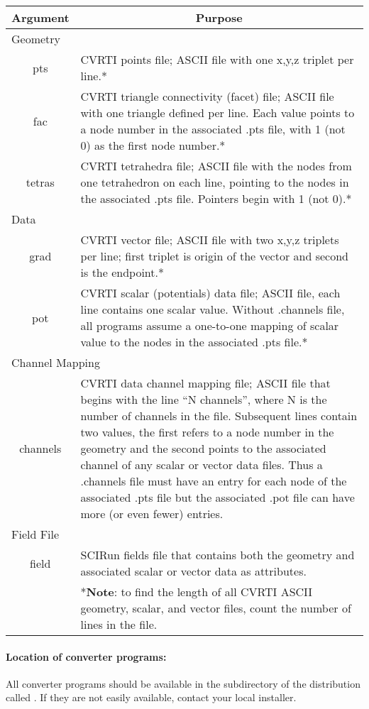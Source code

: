 \begin{center}
\begin{tabular}{|c|p{4in}|} \hline
\multicolumn{1}{|c|}{Argument} &
\multicolumn{1}{|c|}{Purpose} \\ \hline
\multicolumn{2}{|l|}{Geometry} \\ \hline
pts & CVRTI points file; ASCII file with one x,y,z triplet per line.*\\
fac & CVRTI triangle connectivity (facet) file; ASCII file with one
    triangle defined per line.  Each value points to a node number in the
    associated .pts file, with 1 (not 0) as the first node number.*  \\
tetras & CVRTI tetrahedra file; ASCII file with the nodes from one
    tetrahedron on each line, pointing to the nodes in the associated .pts
    file.  Pointers begin with 1 (not 0).*\\ \hline
\multicolumn{2}{|l|}{Data} \\ \hline
grad & CVRTI vector file; ASCII file with two x,y,z triplets per line;
    first triplet is origin of the vector and second is the endpoint.*\\
pot & CVRTI scalar (potentials) data file; ASCII file,  each line contains
    one scalar value.  Without .channels file, all programs assume a
    one-to-one mapping of scalar value to the  nodes in the associated .pts
    file.*\\ \hline
\multicolumn{2}{|l|}{Channel Mapping} \\ \hline
channels & CVRTI data channel mapping file; ASCII file that begins with the
    line ``N channels'', where N is the number of channels in the file.
    Subsequent lines contain two values, the first refers to a node number in
    the geometry and the second points to the associated channel of any scalar
    or vector data files.  Thus a .channels file must have an entry for each
    node of the associated .pts file but the associated .pot file can have more
    (or even fewer) entries.\\ \hline
\multicolumn{2}{|l|}{Field File} \\ \hline
field & SCIRun fields file that contains both the geometry and associated
    scalar or vector data as attributes. \\ \hline
& *\textbf{Note}: to find the length of all CVRTI ASCII geometry,
scalar, and vector files, count the number of lines in the file. \\
\hline
\end{tabular}
\end{center}

\paragraph{Location of converter programs:}
All converter programs should be available in the subdirectory of the
\sr{} distribution called .  If they are
not easily available, contact your local \sr{} installer.
